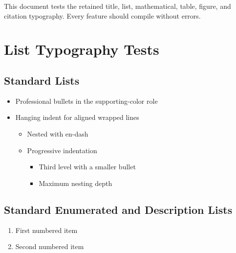 \documentclass[11pt]{article}
\begin{document}
\thispagestyle{empty}
\titlefootnotesetup
\begin{center}
  \vspace*{\titlespaceminor}
  \articledate{\today}
  \begin{articleabstract}
    This document tests the retained title, list, mathematical, table, figure, and citation typography. Every feature should compile without errors.
  \end{articleabstract}
\end{center}
\clearpage
\titlefootnotereset
\setcounter{page}{1}

\section{List Typography Tests}

\subsection{Standard Lists}
\begin{itemize}
\item Professional bullets in the supporting-color role
\item Hanging indent for aligned wrapped lines
  \begin{itemize}
  \item Nested with en-dash
  \item Progressive indentation
    \begin{itemize}
    \item Third level with a smaller bullet
    \item Maximum nesting depth
    \end{itemize}
  \end{itemize}
\end{itemize}

\subsection{Standard Enumerated and Description Lists}
\begin{enumerate}
\item First numbered item
\item Second numbered item
\end{enumerate}
\end{document}
